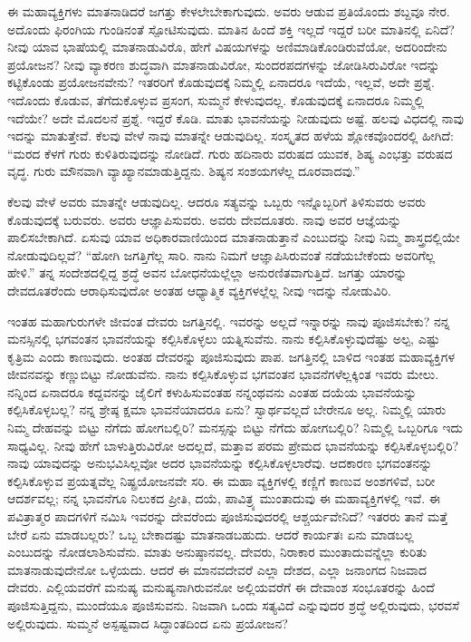 ಈ ಮಹಾವ್ಯಕ್ತಿಗಳು ಮಾತನಾಡಿದರೆ ಜಗತ್ತು ಕೇಳಲೇಬೇಕಾಗುವುದು. ಅವರು ಆಡುವ ಪ್ರತಿಯೊಂದು ಶಬ್ದವೂ ನೇರ. ಅದೊಂದು ಫಿರಂಗಿಯ ಗುಂಡಿನಂತೆ ಸ್ಪೋಟಿಸು\-ವುದು. ಮಾತಿನ ಹಿಂದೆ ಶಕ್ತಿ ಇಲ್ಲದೆ ಇದ್ದರೆ ಬರೀ ಮಾತಿನಲ್ಲಿ ಏನಿದೆ? ನೀವು ಯಾವ ಭಾಷೆಯಲ್ಲಿ ಮಾತನಾಡುವಿರೊ, ಹೇಗೆ ವಿಷಯಗಳನ್ನು ಅಣಿಮಾಡಿಕೊಂಡಿರುವೆಯೋ, ಅದರಿಂದೇನು ಪ್ರಯೋಜನ? ನೀವು ವ್ಯಾಕರಣ ಶುದ್ಧವಾಗಿ ಮಾತನಾಡುವಿರೋ, ಸುಂದರಪದಗಳನ್ನು ಜೋಡಿಸಿರುವಿರೋ ಇದನ್ನು ಕಟ್ಟಿಕೊಂಡು ಪ್ರಯೋಜನವೇನು? ಇತರರಿಗೆ ಕೊಡುವುದಕ್ಕೆ ನಿಮ್ಮಲ್ಲಿ ಏನಾದರೂ ಇದೆಯೆ, ಇಲ್ಲವೆ, ಅದೇ ಪ್ರಶ್ನೆ. ಇದೊಂದು ಕೊಡುವ, ತೆಗೆದುಕೊಳ್ಳುವ ಪ್ರಸಂಗ, ಸುಮ್ಮನೆ ಕೇಳುವುದಲ್ಲ. ಕೊಡುವುದಕ್ಕೆ ಏನಾದರೂ ನಿಮ್ಮಲ್ಲಿ ಇದೆಯೇ? ಅದೇ ಮೊದಲನೆ ಪ್ರಶ್ನೆ. ಇದ್ದರೆ ಕೊಡಿ. ಮಾತು ಭಾವನೆಯನ್ನು ನೀಡುವುದು ಅಷ್ಟೆ. ಹಲವು ವಿಧದಲ್ಲಿ ನಾವು ಇದನ್ನು ಮಾತುತ್ತೇವೆ. ಕೆಲವು ವೇಳೆ ನಾವು ಮಾತನ್ನೇ ಆಡುವುದಿಲ್ಲ. ಸಂಸ್ಕೃತದ ಹಳೆಯ ಶ್ಲೋಕವೊಂದರಲ್ಲಿ ಹೀಗಿದೆ: “ಮರದ ಕೆಳಗೆ ಗುರು ಕುಳಿತಿರುವುದನ್ನು ನೋಡಿದೆ. ಗುರು ಹದಿನಾರು ವರುಷದ ಯುವಕ, ಶಿಷ್ಯ ಎಂಭತ್ತು ವರುಷದ ವೃದ್ಧ. ಗುರು ಮೌನವಾಗಿ ವ್ಯಾಖ್ಯಾನಮಾಡುತ್ತಿದ್ದನು. ಶಿಷ್ಯನ ಸಂಶಯಗಳೆಲ್ಲ ದೂರವಾದವು.”

ಕೆಲವು ವೇಳೆ ಅವರು ಮಾತನ್ನೇ ಆಡುವುದಿಲ್ಲ. ಆದರೂ ಸತ್ಯವನ್ನು ಒಬ್ಬರು ಇನ್ನೊಬ್ಬರಿಗೆ ತಿಳಿಸುವರು ಅವರು ಕೊಡುವುದಕ್ಕೆ ಬರುವರು. ಅವರು ಆಜ್ಞಾಪಿಸುವರು. ಅವರು ದೇವದೂತರು. ನಾವು ಅವರ ಆಜ್ಞೆಯನ್ನು ಪಾಲಿಸಬೇಕಾಗಿದೆ. ಏಸುವು ಯಾವ ಅಧಿಕಾರವಾಣಿಯಿಂದ ಮಾತನಾಡುತ್ತಾನೆ ಎಂಬುದನ್ನು ನೀವು ನಿಮ್ಮ ಶಾಸ್ತ್ರದಲ್ಲಿಯೇ ನೋಡುವುದಿಲ್ಲವೆ? “ಹೋಗಿ ಜಗತ್ತಿಗೆಲ್ಲ ಸಾರಿ. ನಾನು ನಿಮಗೆ ಆಜ್ಞಾಪಿಸಿರುವಂತೆ ನಡೆಯಬೇಕೆಂದು ಅವರಿಗೆಲ್ಲ ಹೇಳಿ.” ತನ್ನ ಸಂದೇಶದಲ್ಲಿದ್ದ ಶ್ರದ್ಧೆ ಅವನ ಬೋಧನೆಯಲ್ಲೆಲ್ಲಾ ಅನುರಣಿತವಾಗುತ್ತಿದೆ. ಜಗತ್ತು ಯಾರನ್ನು ದೇವದೂತರೆಂದು ಆರಾಧಿಸುವುದೋ ಅಂತಹ ಆಧ್ಯಾತ್ಮಿಕ ವ್ಯಕ್ತಿಗಳಲ್ಲೆಲ್ಲ ನೀವು ಇದನ್ನು ನೋಡುವಿರಿ.

ಇಂತಹ ಮಹಾಗುರುಗಳೇ ಜೀವಂತ ದೇವರು ಜಗತ್ತಿನಲ್ಲಿ. ಇವರನ್ನು ಅಲ್ಲದೆ ಇನ್ನಾರನ್ನು ನಾವು ಪೂಜಿಸಬೇಕು? ನನ್ನ ಮನಸ್ಸಿನಲ್ಲಿ ಭಗವಂತನ ಭಾವನೆಯನ್ನು ಕಲ್ಪಿಸಿಕೊಳ್ಳಲು ಯತ್ನಿಸುವೆನು. ನಾನು ಕಲ್ಪಿಸಿಕೊಳ್ಳುವುದೆಷ್ಟು ಅಲ್ಪ, ಎಷ್ಟು ಕೃತ್ರಿಮ ಎಂದು ಕಾಣುವುದು. ಅಂತಹ ದೇವರನ್ನು ಪೂಜಿಸುವುದು ಪಾಪ. ಜಗತ್ತಿನಲ್ಲಿ ಬಾಳಿದ ಇಂತಹ ಮಹಾವ್ಯಕ್ತಿಗಳ ಜೀವನವನ್ನು ಕಣ್ಣುಬಿಟ್ಟು ನೋಡುವೆನು. ನಾನು ಕಲ್ಪಿಸಿಕೊಳ್ಳುವ ಭಗವಂತನ ಭಾವನೆಗಳೆಲ್ಲಕ್ಕಿಂತ ಇವರು ಮೇಲು. ನನ್ನಿಂದ ಏನಾದರೂ ಕದ್ದವನನ್ನು ಜೈಲಿಗೆ ಕಳುಹಿಸುವಂತಹ ನನ್ನಂಥವನು ಎಂತಹ ದಯೆಯ ಭಾವನೆಯನ್ನು ಕಲ್ಪಿಸಿಕೊಳ್ಳಬಲ್ಲ? ನನ್ನ ಶ್ರೇಷ್ಠ ಕ್ಷಮಾ ಭಾವನೆಯಾದರೂ ಏನು? ಸ್ವಾರ್ಥವಲ್ಲದೆ ಬೇರೇನೂ ಅಲ್ಲ. ನಿಮ್ಮಲ್ಲಿ ಯಾರು ನಿಮ್ಮ ದೇಹವನ್ನು ಬಿಟ್ಟು ನೆಗೆದು ಹೋಗಬಲ್ಲಿರಿ? ಮನಸ್ಸನ್ನು ಬಿಟ್ಟು ನೆಗೆದು ಹೋಗಬಲ್ಲಿರಿ? ನಿಮ್ಮಲ್ಲಿ ಒಬ್ಬರಿಗೂ ಇದು ಸಾಧ್ಯವಿಲ್ಲ. ನೀವು ಹೇಗೆ ಬಾಳುತ್ತಿರುವಿರೋ ಅದಲ್ಲದೆ, ಮತ್ತಾವ ಪರಮ ಪ್ರೇಮದ ಭಾವನೆಯನ್ನು ಕಲ್ಪಿಸಿಕೊಳ್ಳಬಲ್ಲಿರಿ? ನಾವು ಯಾವುದನ್ನು ಅನುಭವಿಸಿಲ್ಲವೋ ಅದರ ಭಾವನೆಯನ್ನು ಕಲ್ಪಿಸಿಕೊಳ್ಳಲಾರೆವು. ಆದಕಾರಣ ಭಗವಂತನನ್ನು ಕಲ್ಪಿಸಿಕೊಳ್ಳುವ ಪ್ರಯತ್ನವೆಲ್ಲ ನಿಷ್ಪ್ರಯೋಜನವೇ ಸರಿ. ಈ ಮಹಾ ವ್ಯಕ್ತಿಗಳಲ್ಲಿ ಕಣ್ಣಿಗೆ ಕಾಣುವ ಅಂಶಗಳಿವೆ, ಬರೀ ಆದರ್ಶವಲ್ಲ; ನನ್ನ ಭಾವನೆಗೂ ನಿಲುಕದ ಪ್ರೀತಿ, ದಯೆ, ಪಾವಿತ್ರ್ಯ ಮುಂತಾದುವು ಈ ಮಹಾವ್ಯಕ್ತಿಗಳಲ್ಲಿ ಇವೆ. ಈ ಪವಿತ್ರಾತ್ಮರ ಪಾದಗಳಿಗೆ ನಮಿಸಿ ಇವರನ್ನು ದೇವರೆಂದು ಪೂಜಿಸುವುದರಲ್ಲಿ ಆಶ್ಚರ್ಯವೇನಿದೆ? ಇತರರು ತಾನೆ ಮತ್ತೆ ಬೇರೆ ಏನು ಮಾಡಬಲ್ಲರು? ಒಬ್ಬ ಬೇಕಾದಷ್ಟು ಮಾತನಾಡಬಹುದು. ಆದರೆ ಕಾರ್ಯತಃ ಏನು ಮಾಡಬಲ್ಲ ಎಂಬುದನ್ನು ನೋಡಲಾಶಿಸುವೆನು. ಮಾತು ಅನುಷ್ಠಾನವಲ್ಲ. ದೇವರು, ನಿರಾಕಾರ ಮುಂತಾದುವನ್ನೆಲ್ಲಾ ಕುರಿತು ಮಾತನಾಡುವುದೇನೋ ಒಳ್ಳೆಯದು. ಆದರೆ ಈ ಮಾನವದೇವರೆ ಎಲ್ಲಾ ದೇಶದ, ಎಲ್ಲಾ ಜನಾಂಗದ ನಿಜವಾದ ದೇವರು. ಎಲ್ಲಿಯವರೆಗೆ ಮನುಷ್ಯ ಮನುಷ್ಯನಾಗಿರುವನೋ ಅಲ್ಲಿಯವರೆಗೆ ಈ ದೇವಾಂಶ ಸಂಭೂತರನ್ನು ಹಿಂದೆ ಪೂಜಿಸುತ್ತಿದ್ದನು, ಮುಂದೆಯೂ ಪೂಜಿಸುವನು. ನಿಜವಾಗಿ ಒಂದು ಸತ್ಯವಿದೆ ಎನ್ನುವುದರ ಶ್ರದ್ಧೆ ಅಲ್ಲಿರುವುದು, ಭರವಸೆ ಅಲ್ಲಿರುವುದು. ಸುಮ್ಮನೆ ಅಸ್ಪಷ್ಟವಾದ ಸಿದ್ಧಾಂತದಿಂದ ಏನು ಪ್ರಯೋಜನ?

